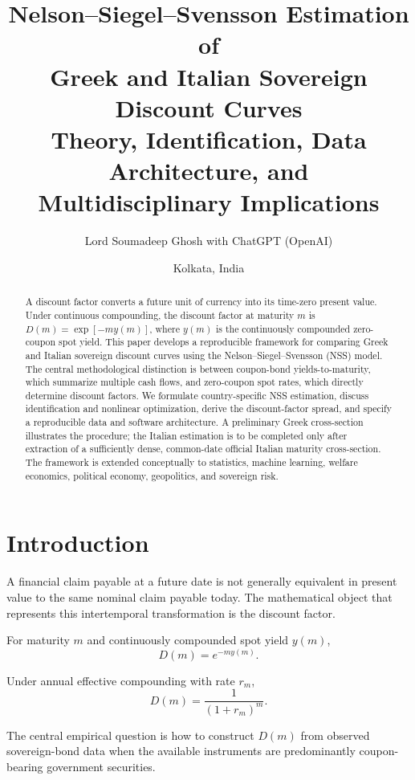 \documentclass[a4paper,10pt]{article}
\title{\textbf{Nelson--Siegel--Svensson Estimation of\\
		Greek and Italian Sovereign Discount Curves}\\
	{Theory, Identification, Data Architecture, and\\
		Multidisciplinary Implications}}
\author{Lord Soumadeep Ghosh with ChatGPT (OpenAI)}
\date{Kolkata, India}
\theoremstyle{remark}
\begin{document}
\maketitle

\begin{abstract}
A discount factor converts a future unit of currency into its time-zero present value. Under continuous compounding, the discount factor at maturity $m$ is $D(m)=\exp[-m y(m)]$, where $y(m)$ is the continuously compounded zero-coupon spot yield. This paper develops a reproducible framework for comparing Greek and Italian sovereign discount curves using the Nelson--Siegel--Svensson (NSS) model. The central methodological distinction is between coupon-bond yields-to-maturity, which summarize multiple cash flows, and zero-coupon spot rates, which directly determine discount factors. We formulate country-specific NSS estimation, discuss identification and nonlinear optimization, derive the discount-factor spread, and specify a reproducible data and software architecture. A preliminary Greek cross-section illustrates the procedure; the Italian estimation is to be completed only after extraction of a sufficiently dense, common-date official Italian maturity cross-section. The framework is extended conceptually to statistics, machine learning, welfare economics, political economy, geopolitics, and sovereign risk.
\end{abstract}

\tableofcontents

\section{Introduction}

A financial claim payable at a future date is not generally equivalent in present value to the same nominal claim payable today. The mathematical object that represents this intertemporal transformation is the discount factor.

For maturity $m$ and continuously compounded spot yield $y(m)$,
\begin{equation}
D(m)=e^{-m y(m)}.
\end{equation}

Under annual effective compounding with rate $r_m$,
\begin{equation}
D(m)=\frac{1}{(1+r_m)^m}.
\end{equation}

The central empirical question is how to construct $D(m)$ from observed sovereign-bond data when the available instruments are predominantly coupon-bearing government securities.
\end{document}
